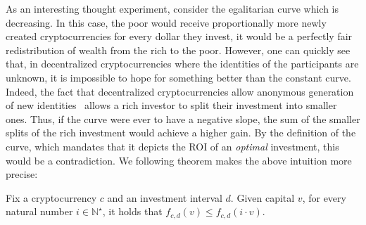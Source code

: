 As an interesting thought experiment, consider the egalitarian curve which is
decreasing. In this case, the poor would receive proportionally more newly
created cryptocurrencies for every dollar they invest, \ie it would be a
perfectly fair redistribution of wealth from the rich to the poor. However, one
can quickly see that, in decentralized cryptocurrencies where the identities of
the participants are unknown, it is impossible to
hope for something better than the constant curve. Indeed, the fact that
decentralized cryptocurrencies allow anonymous generation of new
identities~\cite{douceur2002sybil}
allows a rich investor to split their investment into smaller ones.  Thus, if
the curve were ever to have a negative slope, the sum of the smaller splits of
the rich investment would achieve a higher gain. By the definition of the
curve, which mandates that it depicts the ROI of an \emph{optimal} investment,
this would be a contradiction. We following theorem makes the above intuition
more precise:

\begin{theorem}\label{thm:sybil}
    Fix a cryptocurrency $c$ and an investment interval $d$. Given capital $v$,
    for every natural number $i \in \mathbb{N}^\star$, it
    holds that $f_{c,d}(v) \leq f_{c,d}(i \cdot v)$.
\end{theorem}

